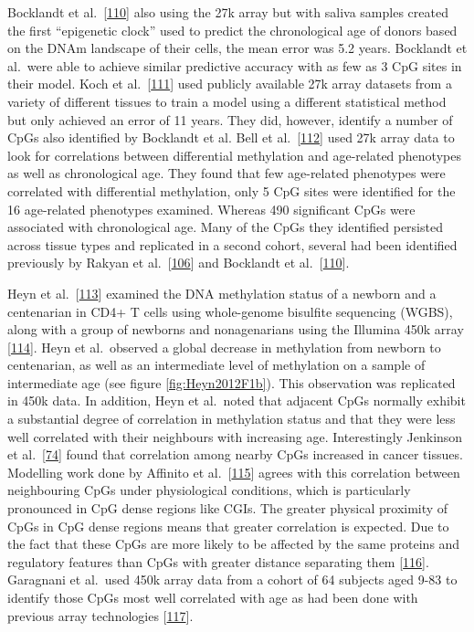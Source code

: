 \documentclass[
]{book}
\begin{document}
Bocklandt et al.~{[}\protect\hyperlink{ref-Bocklandt2011}{110}{]} also using the 27k array but with saliva samples created the first ``epigenetic clock'' used to predict the chronological age of donors based on the DNAm landscape of their cells, the mean error was 5.2 years.
Bocklandt et al.~were able to achieve similar predictive accuracy with as few as 3 CpG sites in their model.
Koch et al.~{[}\protect\hyperlink{ref-Koch2011}{111}{]} used publicly available 27k array datasets from a variety of different tissues to train a model using a different statistical method but only achieved an error of 11 years.
They did, however, identify a number of CpGs also identified by Bocklandt et al.
Bell et al.~{[}\protect\hyperlink{ref-Bell2012}{112}{]} used 27k array data to look for correlations between differential methylation and age-related phenotypes as well as chronological age.
They found that few age-related phenotypes were correlated with differential methylation, only 5 CpG sites were identified for the 16 age-related phenotypes examined. Whereas 490 significant CpGs were associated with chronological age.
Many of the CpGs they identified persisted across tissue types and replicated in a second cohort, several had been identified previously by Rakyan et al.~{[}\protect\hyperlink{ref-Rakyan2010}{106}{]} and Bocklandt et al.~{[}\protect\hyperlink{ref-Bocklandt2011}{110}{]}.

Heyn et al.~{[}\protect\hyperlink{ref-Heyn2012}{113}{]} examined the DNA methylation status of a newborn and a centenarian in CD4+ T cells using whole-genome bisulfite sequencing (WGBS), along with a group of newborns and nonagenarians using the Illumina 450k array {[}\protect\hyperlink{ref-Bibikova2011}{114}{]}.
Heyn et al.~observed a global decrease in methylation from newborn to centenarian, as well as an intermediate level of methylation on a sample of intermediate age (see figure \ref{fig:Heyn2012F1b}).
This observation was replicated in 450k data.
In addition, Heyn et al.~noted that adjacent CpGs normally exhibit a substantial degree of correlation in methylation status and that they were less well correlated with their neighbours with increasing age.
Interestingly Jenkinson et al.~{[}\protect\hyperlink{ref-Jenkinson2017}{74}{]} found that correlation among nearby CpGs increased in cancer tissues.
Modelling work done by Affinito et al.~{[}\protect\hyperlink{ref-Affinito2016}{115}{]} agrees with this correlation between neighbouring CpGs under physiological conditions, which is particularly pronounced in CpG dense regions like CGIs.
The greater physical proximity of CpGs in CpG dense regions means that greater correlation is expected.
Due to the fact that these CpGs are more likely to be affected by the same proteins and regulatory features than CpGs with greater distance separating them {[}\protect\hyperlink{ref-Haerter2014}{116}{]}.
Garagnani et al.~used 450k array data from a cohort of 64 subjects aged 9-83 to identify those CpGs most well correlated with age as had been done with previous array technologies {[}\protect\hyperlink{ref-Garagnani2012}{117}{]}.
\end{document}
